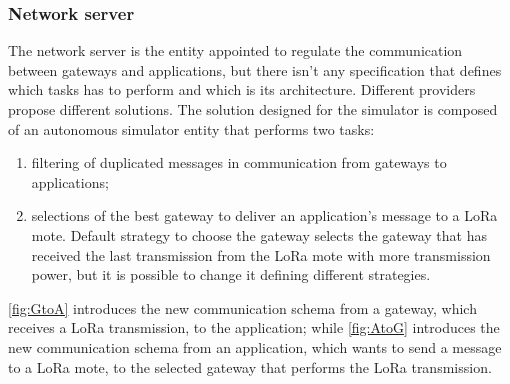 \subsubsection{Network server}
The network server is the entity appointed to regulate the communication between gateways and applications, but there isn't any specification that defines which tasks has to perform and which is its architecture. 
Different providers propose different solutions. 
The solution designed for the simulator is composed of an autonomous simulator entity that performs two tasks:
\begin{enumerate}
    \item filtering of duplicated messages in communication from gateways to applications;
    \item selections of the best gateway to deliver an application's message to a LoRa mote. 
    Default strategy to choose the gateway selects the gateway that has received the last transmission from the LoRa mote with more transmission power, but it is possible to change it defining different strategies. 
\end{enumerate}
\autoref{fig:GtoA} introduces the new communication schema from a gateway, which receives a LoRa transmission, to the application; while \autoref{fig:AtoG} introduces the new communication schema from an application, which wants to send a message to a LoRa mote, to the selected gateway that performs the LoRa transmission.
